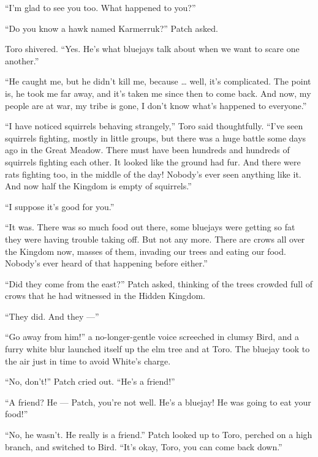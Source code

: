\documentclass[ebook,oneside,openany,17pt]{memoir}
\newenvironment{tolerant}[1]{%
  \par\tolerance=#1\relax
}{%
  \par
}
\begin{document}
“I’m glad to see you too. What happened to you?”

“Do you know a hawk named Karmerruk?” Patch asked.

Toro shivered. “Yes. He’s what bluejays talk about when we want to
scare one another.”

“He caught me, but he didn’t kill me, because … well, it’s
complicated. The point is, he took me far away, and it’s taken me
since then to come back. And now, my people are at war, my tribe is
gone, I don’t know what’s happened to everyone.”

\begin{tolerant}{2000}
“I have noticed squirrels behaving strangely,” Toro said
thoughtfully. “I’ve seen squirrels fighting, mostly in little groups,
but there was a huge battle some days ago in the Great Meadow. There
must have been hundreds and hundreds of squirrels fighting each
other. It looked like the ground had fur. And there were rats fighting
too, in the middle of the day! Nobody’s ever seen anything like
it. And now half the Kingdom is empty of squirrels.”
\end{tolerant}

“I suppose it’s good for you.”

“It was. There was so much food out there, some bluejays were getting
so fat they were having trouble taking off. But not any more. There
are crows all over the Kingdom now, masses of them, invading our trees
and eating our food. Nobody’s ever heard of that happening before
either.”

\begin{tolerant}{1000}
“Did they come from the east?” Patch asked, thinking of the trees
crowded full of crows that he had witnessed in the Hidden Kingdom.
\end{tolerant}

“They did. And they —”

\begin{tolerant}{1000}
“Go away from him!” a no-longer-gentle voice screeched in clumsy Bird,
and a furry white blur launch\-ed itself up the elm tree and at
Toro. The bluejay took to the air just in time to avoid White’s
charge.
\end{tolerant}

“No, don’t!” Patch cried out. “He’s a friend!”

“A friend? He — Patch, you’re not well. He’s a bluejay! He was going
to eat your food!”

“No, he wasn’t. He really is a friend.” Patch looked up to Toro,
perched on a high branch, and switched to Bird. “It’s okay, Toro, you
can come back down.”
\end{document}
